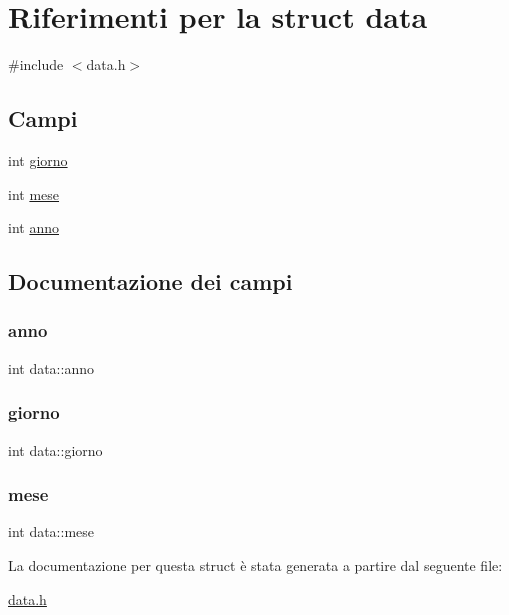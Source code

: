 \hypertarget{structdata}{}\section{Riferimenti per la struct data}
\label{structdata}


{\ttfamily \#include $<$data.\+h$>$}

\subsection*{Campi}
\begin{DoxyCompactItemize}
\item 
int \hyperlink{structdata_a8462358e6ad257d25791c617dba377d2}{giorno}
\item 
int \hyperlink{structdata_afd9f1e1824ac1301989e8738c8e97149}{mese}
\item 
int \hyperlink{structdata_a0c95d7cf0dee8f7b3734810e6fc54988}{anno}
\end{DoxyCompactItemize}


\subsection{Documentazione dei campi}
\mbox{\label{structdata_a0c95d7cf0dee8f7b3734810e6fc54988}} 
\subsubsection{\texorpdfstring{anno}{anno}}
{\footnotesize\ttfamily int data\+::anno}

\mbox{\label{structdata_a8462358e6ad257d25791c617dba377d2}} 
\subsubsection{\texorpdfstring{giorno}{giorno}}
{\footnotesize\ttfamily int data\+::giorno}

\mbox{\label{structdata_afd9f1e1824ac1301989e8738c8e97149}} 
\subsubsection{\texorpdfstring{mese}{mese}}
{\footnotesize\ttfamily int data\+::mese}



La documentazione per questa struct è stata generata a partire dal seguente file\+:\begin{DoxyCompactItemize}
\item 
\hyperlink{data_8h}{data.\+h}\end{DoxyCompactItemize}

